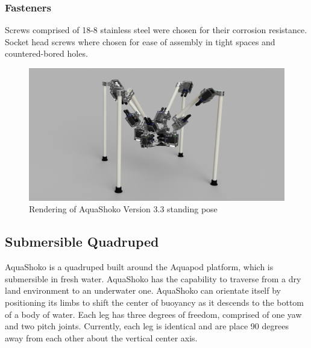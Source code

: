 \subsubsection{Fasteners}
Screws comprised of 18-8 stainless steel were chosen for their corrosion resistance. Socket head screws where chosen for ease of assembly in tight spaces and countered-bored holes.

\begin{figure}
\centering
\includegraphics[width=1.0\columnwidth]{./img/shokopose.png}
\caption{Rendering of AquaShoko Version 3.3 standing pose}
\label{fig:shoko stand pose}
\end{figure}


\subsection{Submersible Quadruped}
AquaShoko is a quadruped built around the Aquapod platform, which is submersible in fresh water. AquaShoko has the capability to traverse from a dry land environment to an underwater one. AquaShoko can orientate itself by positioning its limbs to shift the center of buoyancy as it descends to the bottom of a body of water. Each leg has three degrees of freedom, comprised of one yaw and two pitch joints. Currently, each leg is identical and are place 90 degrees away from each other about the vertical center axis. 



